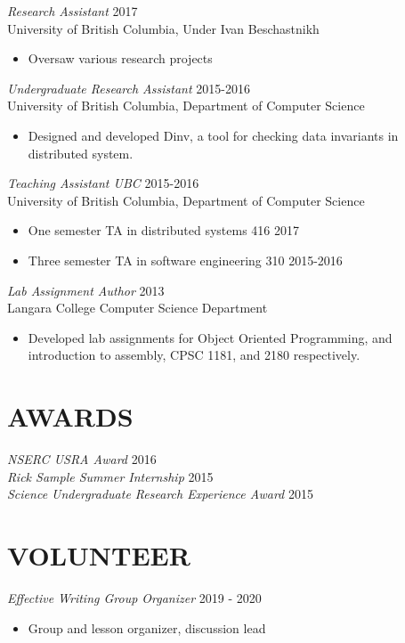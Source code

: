 \documentclass[line,margin]{res}
\begin{document}
\begin{resume}
{{\sl Research Assistant} \hfill 2017\\
    University of British Columbia, Under Ivan Beschastnikh
\begin{itemize} \itemsep -2pt
        \item Oversaw various research projects
    \end{itemize}

{\sl Undergraduate Research Assistant} \hfill 2015-2016\\
	University of British Columbia, Department of Computer Science
\begin{itemize} \itemsep -2pt
        \item Designed and developed Dinv, a tool for checking data invariants in distributed system.
    \end{itemize}


{\sl Teaching Assistant UBC} \hfill 2015-2016\\
	University of British Columbia, Department of Computer Science
\begin{itemize} \itemsep -2pt
        \item One semester TA in distributed systems 416 \hfill 2017
		\item Three semester TA in software engineering 310 \hfill 2015-2016\\
	\end{itemize}
{\sl Lab Assignment Author} \hfill 2013\\
	Langara College Computer Science Department
	\begin{itemize} \itemsep -2pt
			\item Developed lab assignments for Object Oriented Programming, and introduction to assembly, CPSC 1181, and 2180 respectively.
	\end{itemize}
    

\section{AWARDS}
{\sl NSERC USRA Award} \hfill 2016\\
{\sl Rick Sample Summer Internship} \hfill 2015\\
{\sl Science Undergraduate Research Experience Award} \hfill 2015\\


\section{VOLUNTEER}

{\sl Effective Writing Group Organizer} {\hfill 2019 - 2020}
    \begin{itemize}
        \item Group and lesson organizer, discussion lead
    \end{itemize}

}
\end{resume}
\end{document}
